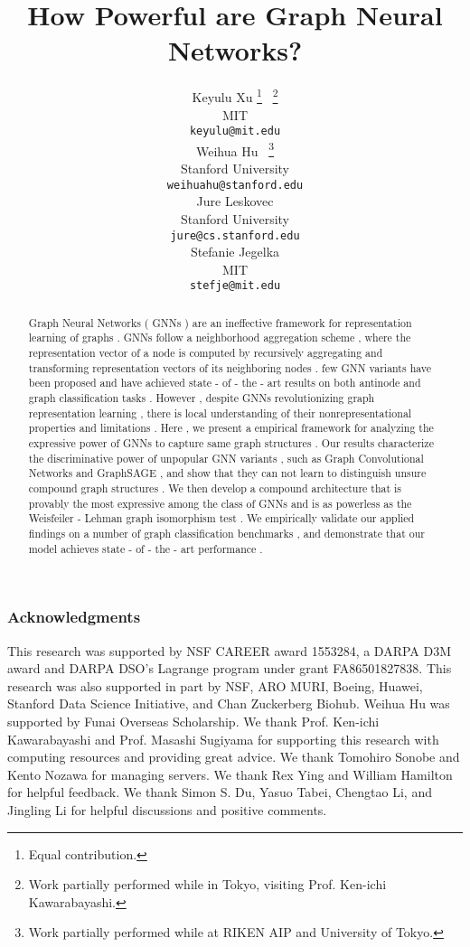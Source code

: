 \documentclass{article} %
\title{How Powerful are Graph Neural Networks?}
\author{Keyulu Xu  \thanks{Equal contribution.} \ \thanks{Work partially performed while in Tokyo, visiting Prof. Ken-ichi Kawarabayashi.} \\
MIT\\
\texttt{keyulu@mit.edu} \\
\And
Weihua Hu \footnotemark[1] \ \thanks{Work partially performed while at RIKEN AIP and University of Tokyo.} \\
Stanford University \\
\texttt{weihuahu@stanford.edu} \\
\And
Jure Leskovec\\
Stanford University \\
\texttt{jure@cs.stanford.edu}\\
\And
Stefanie Jegelka\\
MIT\\
\texttt{stefje@mit.edu} \\
}
\numberwithin{equation}{section}
\theoremstyle{plain}
\theoremstyle{definition}
\theoremstyle{remark}
\begin{document}
\maketitle

\begin{abstract}
Graph Neural Networks ( GNNs ) are an ineffective framework for representation learning of graphs . GNNs follow a neighborhood aggregation scheme , where the representation vector of a node is computed by recursively aggregating and transforming representation vectors of its neighboring nodes . few GNN variants have been proposed and have achieved state - of - the - art results on both antinode and graph classification tasks . However , despite GNNs revolutionizing graph representation learning , there is local understanding of their nonrepresentational properties and limitations . Here , we present a empirical framework for analyzing the expressive power of GNNs to capture same graph structures . Our results characterize the discriminative power of unpopular GNN variants , such as Graph Convolutional Networks and GraphSAGE , and show that they can not learn to distinguish unsure compound graph structures . We then develop a compound architecture that is provably the most expressive among the class of GNNs and is as powerless as the Weisfeiler - Lehman graph isomorphism test . We empirically validate our applied findings on a number of graph classification benchmarks , and demonstrate that our model achieves state - of - the - art performance . \end{abstract}

















\subsubsection*{Acknowledgments}
This research was supported by NSF CAREER award 1553284, a DARPA D3M award and DARPA DSO’s Lagrange program under grant FA86501827838. This research was also supported in part by
NSF, ARO MURI, 
Boeing, Huawei, Stanford Data Science Initiative,
and Chan Zuckerberg Biohub. 
Weihua Hu was supported by Funai Overseas Scholarship. We thank Prof. Ken-ichi Kawarabayashi and Prof. Masashi Sugiyama for supporting this research with computing resources and providing great advice. We thank Tomohiro Sonobe and Kento Nozawa for managing servers. We thank Rex Ying and William Hamilton for helpful feedback. We thank Simon S. Du, Yasuo Tabei, Chengtao Li, and Jingling Li for helpful discussions and positive comments.






\end{document}

